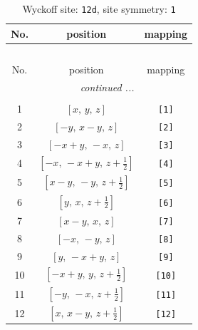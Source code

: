 \documentclass[fleqn,8pt]{jsarticle}
\begin{document}
\begin{longtable}{ccc}
\caption{Wyckoff site: {\tt 12d}, site symmetry: {\tt 1}}
 \\
 \hline \hline
No. & position & mapping \\ \hline \endfirsthead

\multicolumn{2}{l}{\tablename\ \thetable{}} \\
 \hline \hline
No. & position & mapping \\ \hline \endhead

 \hline \hline
\multicolumn{2}{r}{\footnotesize\it continued ...} \\ \endfoot

 \hline \hline
\multicolumn{2}{r}{} \\ \endlastfoot

1 & $\left[ x,\, y,\, z \right]$ & {\tt [1]} \\ \hline
2 & $\left[ - y,\, x - y,\, z \right]$ & {\tt [2]} \\ \hline
3 & $\left[ - x + y,\, - x,\, z \right]$ & {\tt [3]} \\ \hline
4 & $\left[ - x,\, - x + y,\, z + \frac{1}{2} \right]$ & {\tt [4]} \\ \hline
5 & $\left[ x - y,\, - y,\, z + \frac{1}{2} \right]$ & {\tt [5]} \\ \hline
6 & $\left[ y,\, x,\, z + \frac{1}{2} \right]$ & {\tt [6]} \\ \hline
7 & $\left[ x - y,\, x,\, z \right]$ & {\tt [7]} \\ \hline
8 & $\left[ - x,\, - y,\, z \right]$ & {\tt [8]} \\ \hline
9 & $\left[ y,\, - x + y,\, z \right]$ & {\tt [9]} \\ \hline
10 & $\left[ - x + y,\, y,\, z + \frac{1}{2} \right]$ & {\tt [10]} \\ \hline
11 & $\left[ - y,\, - x,\, z + \frac{1}{2} \right]$ & {\tt [11]} \\ \hline
12 & $\left[ x,\, x - y,\, z + \frac{1}{2} \right]$ & {\tt [12]} \\
\end{longtable}
\end{document}
